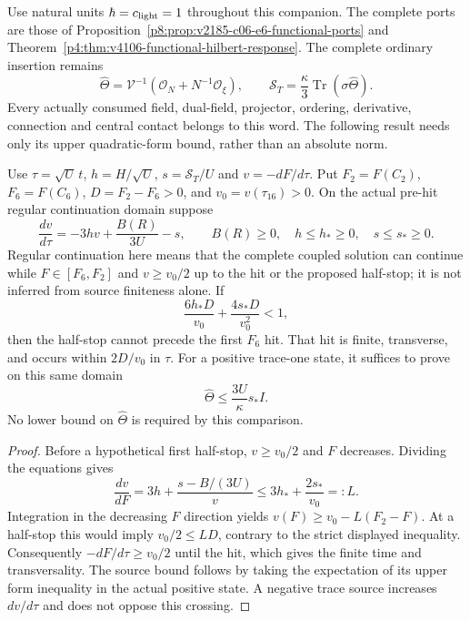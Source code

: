 \documentclass[12pt,a4paper]{article}
\begin{document}
Use natural units $\hbar=c_{\rm light}=1$ throughout this companion.
The complete ports are those of
Proposition~\ref{p8:prop:v2185-c06-e6-functional-ports} and
Theorem~\ref{p4:thm:v4106-functional-hilbert-response}.
The complete ordinary insertion remains
\[
 \widehat\Theta=\mathcal V^{-1}
 (\mathcal O_N+N^{-1}\mathcal O_\xi),\qquad
 \mathcal S_T=\frac\kappa3\operatorname{Tr}(\sigma\widehat\Theta).
\]
Every actually consumed field, dual-field, projector, ordering, derivative,
connection and central contact belongs to this word. The following result
needs only its upper quadratic-form bound, rather than an absolute norm.

\begin{proposition}
\label{p8:prop:v2189-c06-one-sided-first-hit}
Use $\tau=\sqrt U\,t$, $h=H/\sqrt U$, $s=\mathcal S_T/U$ and
$v=-dF/d\tau$. Put $F_2=F(C_2)$, $F_6=F(C_6)$,
$D=F_2-F_6>0$, and $v_0=v(\tau_{16})>0$.
On the actual pre-hit regular continuation domain suppose
\[
 \frac{dv}{d\tau}=-3hv+\frac{B(R)}{3U}-s,
 \qquad B(R)\ge0,\quad h\le h_*\ge0,\quad s\le s_*\ge0.
\]
Regular continuation here means that the complete coupled solution can
continue while $F\in[F_6,F_2]$ and $v\ge v_0/2$ up to the hit or
the proposed half-stop; it is not inferred from source finiteness alone.
If
\[
 \boxed{\frac{6h_*D}{v_0}+\frac{4s_*D}{v_0^2}<1,}
\]
then the half-stop cannot precede the first $F_6$ hit. That hit is finite,
transverse, and occurs within $2D/v_0$ in $\tau$.
For a positive trace-one state, it suffices to prove on this same domain
\[
 \widehat\Theta\le\frac{3U}{\kappa}s_* I.
\]
No lower bound on $\widehat\Theta$ is required by this comparison.
\end{proposition}
\begin{proof}
Before a hypothetical first half-stop, $v\ge v_0/2$ and $F$ decreases.
Dividing the equations gives
\[
 \frac{dv}{dF}=3h+\frac{s-B/(3U)}v
 \le 3h_*+\frac{2s_*}{v_0}=:L.
\]
Integration in the decreasing $F$ direction yields
$v(F)\ge v_0-L(F_2-F)$. At a half-stop this would imply
$v_0/2\le LD$, contrary to the strict displayed inequality.
Consequently $-dF/d\tau\ge v_0/2$ until the hit, which gives the finite
time and transversality. The source bound follows by taking the expectation
of its upper form inequality in the actual positive state. A negative
trace source increases $dv/d\tau$ and does not oppose this crossing.
\end{proof}
\end{document}
